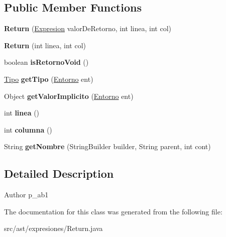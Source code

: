 \subsection*{Public Member Functions}
\begin{DoxyCompactItemize}
\item 
\mbox{\label{classast_1_1expresiones_1_1_return_a0edad8c4d216b655332c9c45bafb5869}} 
{\bfseries Return} (\mbox{\hyperlink{interfaceast_1_1_expresion}{Expresion}} valor\+De\+Retorno, int linea, int col)
\item 
\mbox{\label{classast_1_1expresiones_1_1_return_a6fd9aa73203b52a8b59c73486b7c67e7}} 
{\bfseries Return} (int linea, int col)
\item 
\mbox{\label{classast_1_1expresiones_1_1_return_a9df47901353b0e95b77e02ae9f0c3681}} 
boolean {\bfseries is\+Retorno\+Void} ()
\item 
\mbox{\label{classast_1_1expresiones_1_1_return_ad667e0168d21509b6bf60e8adfafffbc}} 
\mbox{\hyperlink{classentorno_1_1_tipo}{Tipo}} {\bfseries get\+Tipo} (\mbox{\hyperlink{classentorno_1_1_entorno}{Entorno}} ent)
\item 
\mbox{\label{classast_1_1expresiones_1_1_return_a00d7e1d288717a291202480d75cc2a4c}} 
Object {\bfseries get\+Valor\+Implicito} (\mbox{\hyperlink{classentorno_1_1_entorno}{Entorno}} ent)
\item 
\mbox{\label{classast_1_1expresiones_1_1_return_adae64964aa7ae224cf146349a3689e6a}} 
int {\bfseries linea} ()
\item 
\mbox{\label{classast_1_1expresiones_1_1_return_a503b256fb62db81f0080573d129eab17}} 
int {\bfseries columna} ()
\item 
\mbox{\label{classast_1_1expresiones_1_1_return_aae6bde9860f51ec171be9b75e2671d4f}} 
String {\bfseries get\+Nombre} (String\+Builder builder, String parent, int cont)
\end{DoxyCompactItemize}


\subsection{Detailed Description}
\begin{DoxyAuthor}{Author}
p\+\_\+ab1 
\end{DoxyAuthor}


The documentation for this class was generated from the following file\+:\begin{DoxyCompactItemize}
\item 
src/ast/expresiones/Return.\+java\end{DoxyCompactItemize}
